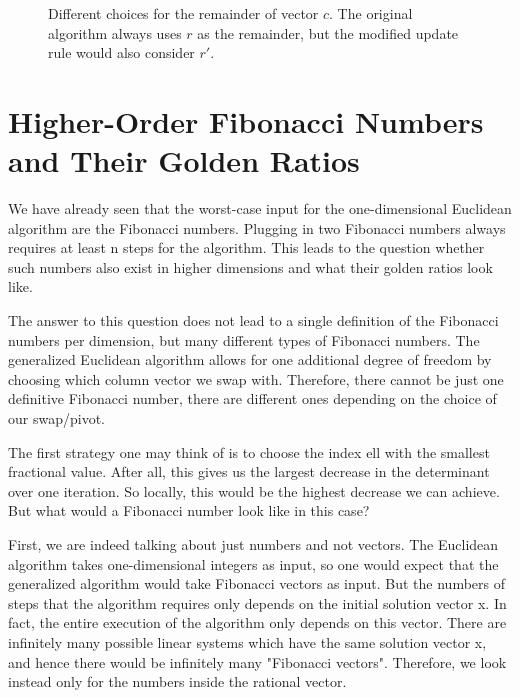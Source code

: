 \begin{figure}[t]
  \centering
  
  \caption{
    Different choices for the remainder of vector $c$. The original algorithm
    always uses $r$ as the remainder, but the modified update rule would also consider $r'$.}
\end{figure}

\section{Higher-Order Fibonacci Numbers and Their Golden Ratios}

We have already seen that the worst-case input for the one-dimensional
Euclidean algorithm are the Fibonacci numbers.
Plugging in two Fibonacci numbers always requires at least n steps for the
algorithm.
This leads to the question whether such numbers also exist in higher dimensions
and what their golden ratios look like.


The answer to this question does not lead to a single definition of the
Fibonacci numbers per dimension, but many different types of Fibonacci numbers.
The generalized Euclidean algorithm allows for one additional degree of freedom
by choosing which column vector we swap with.
Therefore, there cannot be just one definitive Fibonacci number, there are
different ones depending on the choice of our swap/pivot.

The first strategy one may think of is to choose the index ell with the
smallest fractional value.
After all, this gives us the largest decrease in the determinant over one
iteration.
So locally, this would be the highest decrease we can achieve. But what would a
Fibonacci number look like in this case?

First, we are indeed talking about just numbers and not vectors.
The Euclidean algorithm takes one-dimensional integers as input, so one would
expect that the generalized algorithm would take Fibonacci vectors as input.
But the numbers of steps that the algorithm requires only depends on the
initial solution vector x.
In fact, the entire execution of the algorithm only depends on this vector.
There are infinitely many possible linear systems which have the same solution
vector x, and hence there would be infinitely many "Fibonacci vectors".
Therefore, we look instead only for the numbers inside the rational vector.


